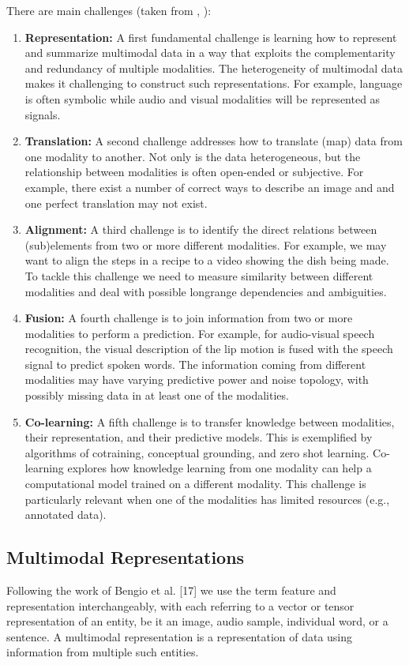 There are main challenges (taken from \cite{Baltruvsaitis2017multimodal}, ):
\begin{enumerate}
\item \textbf{Representation:} A first fundamental challenge is learning how to represent and summarize multimodal data in a way that exploits the complementarity and redundancy of multiple modalities. The heterogeneity of multimodal data makes it challenging to construct such representations. For example, language is often symbolic while audio and visual modalities will be represented as signals.
\item \textbf{Translation:} A second challenge addresses how to translate (map) data from one modality to another. Not only is the data heterogeneous, but the relationship between modalities is often open-ended or subjective. For example, there exist a number of correct ways to describe an image and and one perfect translation may not exist.
\item \textbf{Alignment:} A third challenge is to identify the direct relations between (sub)elements from two or more different modalities. For example, we may want to align the steps in a recipe to a video showing the dish being made. To tackle this challenge we need to measure similarity between different modalities and deal with possible longrange dependencies and ambiguities.
\item \textbf{Fusion:} A fourth challenge is to join information from two or more modalities to perform a prediction. For example, for audio-visual speech recognition, the visual description of the lip motion is fused with the speech signal to predict spoken words. The information coming
from different modalities may have varying predictive power and noise topology, with possibly missing data in at least one of the modalities.
\item \textbf{Co-learning:} A fifth challenge is to transfer knowledge between modalities, their representation, and their predictive models. This is exemplified by algorithms of cotraining,
conceptual grounding, and zero shot learning.
Co-learning explores how knowledge learning from one modality can help a computational model trained on a different modality. This challenge is particularly relevant when one of the modalities has limited resources (e.g., annotated data).
\end{enumerate}

\subsection{Multimodal Representations}
Following the work of Bengio et al. [17]
we use the term feature and representation interchangeably, with each referring to a vector or tensor representation of an entity, be it an image, audio sample, individual word, or a sentence. A multimodal representation is a representation of data using information from multiple such entities. \cite{Baltruvsaitis2017multimodal}


